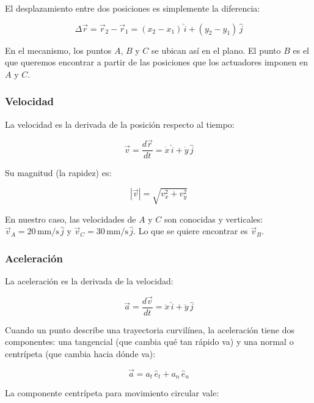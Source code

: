 El desplazamiento entre dos posiciones es simplemente la diferencia:

\begin{equation}
	\Delta\vec{r} = \vec{r}_2 - \vec{r}_1 = (x_2 - x_1)\,\hat{i} + (y_2 - y_1)\,\hat{j}
\end{equation}

En el mecanismo, los puntos $A$, $B$ y $C$ se ubican así en el plano. El punto $B$ es el
que queremos encontrar a partir de las posiciones que los actuadores imponen en $A$ y $C$.
\\
\subsubsection{Velocidad}

La velocidad es la derivada de la posición respecto al tiempo:

\begin{equation}
	\vec{v} = \frac{d\vec{r}}{dt} = \dot{x}\,\hat{i} + \dot{y}\,\hat{j}
\end{equation}

Su magnitud (la rapidez) es:

\begin{equation}
	|\vec{v}| = \sqrt{v_x^2 + v_y^2}
\end{equation}

En nuestro caso, las velocidades de $A$ y $C$ son conocidas y verticales:
$\vec{v}_A = 20\,\text{mm/s}\,\hat{j}$ y $\vec{v}_C = 30\,\text{mm/s}\,\hat{j}$.
Lo que se quiere encontrar es $\vec{v}_B$.

\subsubsection{Aceleración}

La aceleración es la derivada de la velocidad:

\begin{equation}
	\vec{a} = \frac{d\vec{v}}{dt} = \ddot{x}\,\hat{i} + \ddot{y}\,\hat{j}
\end{equation}

Cuando un punto describe una trayectoria curvilínea, la aceleración tiene dos componentes:
una tangencial (que cambia qué tan rápido va) y una normal o centrípeta (que cambia hacia
dónde va):

\begin{equation}
	\vec{a} = a_t\,\hat{e}_t + a_n\,\hat{e}_n
\end{equation}

La componente centrípeta para movimiento circular vale:

